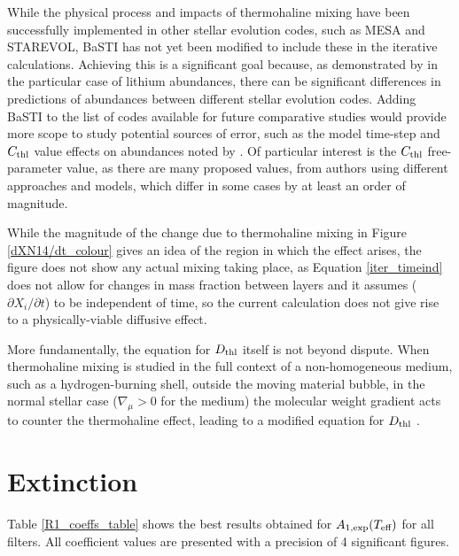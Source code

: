 \documentclass[12pt, a4paper]{report}
\begin{document}
While the physical process and impacts of thermohaline mixing have been successfully implemented in other stellar evolution codes, such as MESA and STAREVOL, BaSTI has not yet been modified to include these in the iterative calculations. Achieving this is a significant goal because, as demonstrated by \cite{2015MNRAS.446.2673L} in the particular case of lithium abundances, there can be significant differences in predictions of abundances between different stellar evolution codes. Adding BaSTI to the list of codes available for future comparative studies would provide more scope to study potential sources of error, such as the model time-step and $C_{\textnormal{thl}}$ value effects on abundances noted by \cite{2015MNRAS.446.2673L}. Of particular interest is the $C_{\textnormal{thl}}$ free-parameter value, as there are many proposed values, from authors using different approaches and models, which differ in some cases by at least an order of magnitude.

While the magnitude of the change due to thermohaline mixing in Figure \ref{dXN14/dt_colour} gives an idea of the region in which the effect arises, the figure does not show any actual mixing taking place, as Equation \ref{iter_timeind} does not allow for changes in mass fraction between layers and it assumes ($\partial X_{i}/\partial t$) to be independent of time, so the current calculation does not give rise to a physically-viable diffusive effect.
\cite{2010A&A...521A...9C}

More fundamentally, the equation for $D_{\textnormal{thl}}$ itself is not beyond dispute. When thermohaline mixing is studied in the full context of a non-homogeneous medium, such as a hydrogen-burning shell, outside the moving material bubble, in the normal stellar case ($\nabla _{\mu} > 0$ for the medium) the molecular weight gradient acts to counter the thermohaline effect, leading to a modified equation for $D_{\textnormal{thl}}$ \citep{2010ApJ...723..563D}.

\section{Extinction}
Table \ref{R1_coeffs_table} shows the best results obtained for $A_{1,\textnormal{exp}} (T_{\textnormal{eff}})$ for all filters. All coefficient values are presented with a precision of 4 significant figures. 
\end{document}
